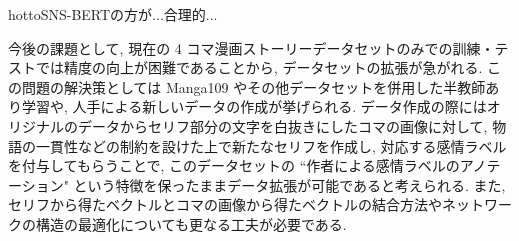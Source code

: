 \documentclass[a4paper,twoside,twocolumn,10pt]{jarticle}     %
\begin{document}
hottoSNS-BERTの方が...合理的...

今後の課題として, 現在の 4 コマ漫画ストーリーデータセットのみでの訓練・テストでは精度の向上が困難であることから, データセットの拡張が急がれる. この問題の解決策としては Manga109 やその他データセットを併用した半教師あり学習や, 人手による新しいデータの作成が挙げられる. データ作成の際にはオリジナルのデータからセリフ部分の文字を白抜きにしたコマの画像に対して, 物語の一貫性などの制約を設けた上で新たなセリフを作成し, 対応する感情ラベルを付与してもらうことで, このデータセットの ``作者による感情ラベルのアノテーション" という特徴を保ったままデータ拡張が可能であると考えられる. また, セリフから得たベクトルとコマの画像から得たベクトルの結合方法やネットワークの構造の最適化についても更なる工夫が必要である.




\end{document}
